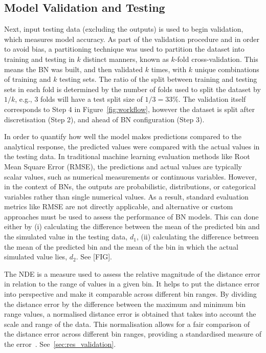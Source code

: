\documentclass[journal]{IEEEtran}
\begin{document}
\subsection{Model Validation and Testing}\label{sec:meth_validation} 

Next, input testing data (excluding the outputs) is used to begin validation, which measures model accuracy. As part of the validation procedure and in order to avoid bias, a partitioning technique was used to partition the dataset into training and testing in $k$ distinct manners, known as $k$-fold cross-validation. This means the BN was built, and then validated $k$ times, with $k$ unique combinations of training and $k$ testing sets. The ratio of the split between training and testing sets in each fold is determined by the number of folds used to split the dataset by $1/k$, e.g., 3 folds will have a test split size of $1/3 = 33\%$. The validation itself corresponds to Step 4 in Figure~\ref{fig:workflow}, however the dataset is split after discretisation (Step 2), and ahead of BN configuration (Step 3). 

In order to quantify how well the model makes predictions compared to the analytical response, the predicted values were compared with the actual values in the testing data. In traditional machine learning evaluation methods like Root Mean Square Error (RMSE), the predictions and actual values are typically scalar values, such as numerical measurements or continuous variables. However, in the context of BNs, the outputs are probabilistic, distributions, or categorical variables rather than single numerical values. As a result, standard evaluation metrics like RMSE are not directly applicable, and alternative or custom approaches must be used to assess the performance of BN models. This can done either by (i) calculating the difference between the mean of the predicted bin and the simulated value in the testing data, $d_{1}$, (ii) calculating the difference between the mean of the predicted bin and the mean of the bin in which the actual simulated value lies, $d_{2}$. See [FIG].

The NDE is a measure used to assess the relative magnitude of the distance error in relation to the range of values in a given bin. It helps to put the distance error into perspective and make it comparable across different bin ranges. By dividing the distance error by the difference between the maximum and minimum bin range values, a normalised distance error is obtained that takes into account the scale and range of the data. This normalisation allows for a fair comparison of the distance error across different bin ranges, providing a standardised measure of the error~\cite{Conti2019BayesianDesign}. See~\ref{sec:res_validation}. 
\end{document}
